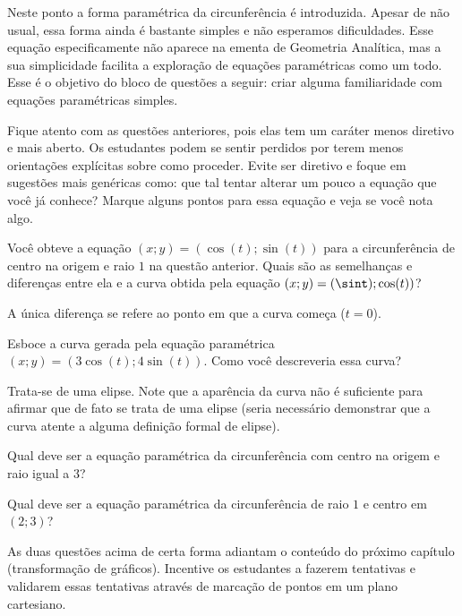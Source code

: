 \documentclass[main_estudante.tex]{subfiles}
\begin{document}
Neste ponto a forma paramétrica da circunferência é introduzida. Apesar de não usual, essa forma ainda é bastante simples e não esperamos dificuldades. Esse equação especificamente não aparece na ementa de Geometria Analítica, mas a sua simplicidade facilita a exploração de equações paramétricas como um todo. Esse é o objetivo do bloco de questões a seguir: criar alguma familiaridade com equações paramétricas simples. 

Fique atento com as questões anteriores, pois elas tem um caráter menos diretivo e mais aberto. Os estudantes podem se sentir perdidos por terem menos orientações explícitas sobre como proceder. Evite ser diretivo e foque em sugestões mais genéricas como: que tal tentar alterar um pouco a equação que você já conhece? Marque alguns pontos para essa equação e veja se você nota algo.

\begin{questao}
Você obteve a equação $(x;y)=(\cos(t);\sin(t))$ para a circunferência de centro na origem e raio $1$ na questão anterior. Quais são as semelhanças e diferenças entre ela e a curva obtida pela equação $(x;y)=(\sint);\cos(t))$?
\end{questao}

A única diferença se refere ao ponto em que a curva começa ($t=0$).

\begin{questao}
Esboce a curva gerada pela equação paramétrica $(x;y)=(3\cos(t);4\sin(t))$. Como você descreveria essa curva?
\end{questao}

Trata-se de uma elipse. Note que a aparência da curva não é suficiente para afirmar que de fato se trata de uma elipse (seria necessário demonstrar que a curva atente a alguma definição formal de elipse).

\begin{questao}
Qual deve ser a equação paramétrica da circunferência com centro na origem e raio igual a $3$?
\end{questao}

\begin{questao}
Qual deve ser a equação paramétrica da circunferência de raio $1$ e centro em $(2;3)$?
\end{questao}

As duas questões acima de certa forma adiantam o conteúdo do próximo capítulo (transformação de gráficos). Incentive os estudantes a fazerem tentativas e validarem essas tentativas através de marcação de pontos em um plano cartesiano.
\end{document}
